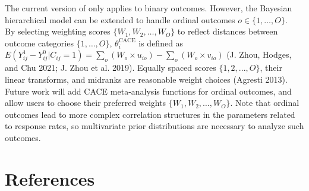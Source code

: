 The current version of  only applies to binary outcomes.
However, the Bayesian hierarchical model can be extended to handle ordinal outcomes \(o \in \{1, \dots, O\}\).\\
By selecting weighting scores \(\{W_1, W_2, \dots, W_O\}\) to reflect distances between outcome categories \(\{1, \dots, O\}\), \(\theta^\text{CACE}_i\) is defined as \(E(Y^1_{ij}-Y^0_{ij}|C_{ij}=1)=\sum_o{(W_o\times u_{io})}-\sum_o{(W_o\times v_{io})}\) (J. Zhou, Hodges, and Chu 2021; J. Zhou et al. 2019). Equally spaced scores \(\{1,2,...,O\}\), their linear transforms, and midranks are reasonable weight choices (Agresti 2013).
Future work will add CACE meta-analysis functions for ordinal outcomes, and allow users to choose their preferred weights \(\{W_1, W_2, \dots, W_O\}\).
Note that ordinal outcomes lead to more complex correlation structures in the parameters related to response rates, so multivariate prior distributions are necessary to analyze such outcomes.

\hypertarget{references}{%
\section*{References}\label{references}}


